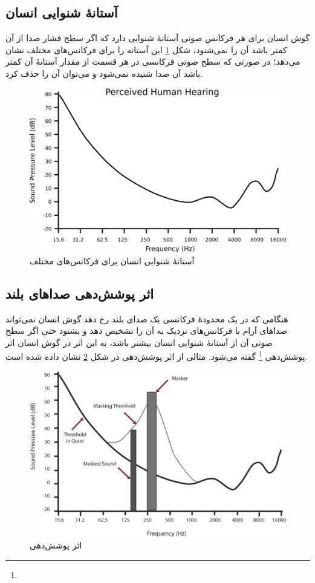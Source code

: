  \subsection{آستانهٔ شنوایی انسان}
 گوش انسان برای هر فرکانس صوتی آستانهٔ شنوایی دارد که اگر سطح فشار صدا از آن کمتر باشد آن را نمی‌شنود، 
 شکل 
 \ref{human_hearing}
 این آستانه را برای فرکانس‌های مختلف نشان می‌دهد؛ در صورتی که سطح صوتی فرکانسی در هر قسمت از مقدار آستانهٔ آن کمتر باشد آن صدا شنیده نمی‌شود و 
 می‌توان آن را حذف کرد.

 \begin{figure}[]
         \centering
         \includegraphics[width=\textwidth]{figs/human_hearing.png}
         \caption{آستانهٔ شنوایی انسان برای فرکانس‌های مختلف}
         \label{human_hearing}
 \end{figure}
 \subsection{اثر پوشش‌دهی صداهای بلند}
 هنگامی که در یک محدودهٔ فرکانسی یک صدای بلند رخ دهد گوش انسان نمی‌تواند صداهای آرام با فرکانس‌های نزدیک به آن را تشخیص دهد و بشنود
 حتی اگر سطح صوتی آن از آستانهٔ شنوایی انسان بیشتر باشد، به این اثر در گوش انسان اثر پوشش‌دهی 
 \footnote{} 
 گفته می‌شود. 
 مثالی از اثر پوشش‌دهی در شکل 
 \ref{masking_effect}
 نشان داده شده است. 

 \begin{figure}[]
         \centering
         \includegraphics[width=\textwidth]{figs/masking_effect.png}
         \caption{اثر پوشش‌دهی}
         \label{masking_effect}
 \end{figure}

